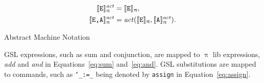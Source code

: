 \documentclass[a4paper,openany]{book}
\begin{document}
\begin{PiDen}
{\begin{align}
%
\llbracket \mathtt{E} \rrbracket^\mathit{act}_\uppi & = \llbracket \mathtt{E} \rrbracket_\uppi, \\
%
\llbracket \mathtt{E} \mbox{\tt,} \mathtt{A} \rrbracket^\mathit{act}_\uppi & =  \mathit{act}(\llbracket \mathtt{E}\rrbracket_\uppi, \llbracket \mathtt{A}\rrbracket^\mathit{act}_\uppi ).
%
%
%
%
%
\end{align}}
\caption{Abstract Machine Notation}
\label{piden:amn}
\end{PiDen}

GSL expressions, such as sum and conjunction, are mapped to $\uppi$ lib expressions, \emph{add} and \emph{and} in Equations~\ref{eq:sum} and~\ref{eq:and}. GSL substitutions are mapped to commands, such as \texttt{`\_:=\_}  being denoted by \texttt{assign} in Equation~\ref{eq:assign}. 

\end{document}
